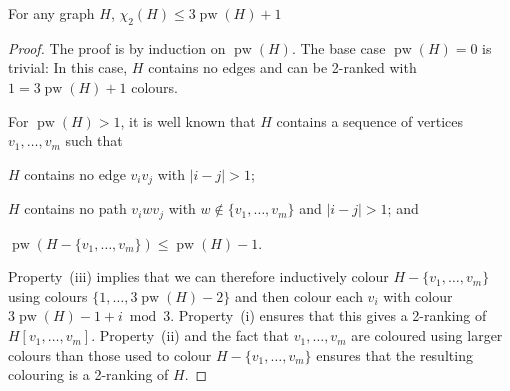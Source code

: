 \documentclass[kpfonts]{patmorin}
\DeclareMathOperator{\pw}{pw}
\newcommand{\trn}{\chi_2}
\newcommand{\htrn}{\hat{\chi}_2}
\theoremstyle{named}
\begin{document}
%
%


\begin{lem}\label{pathwidth}
    For any graph $H$, $\trn(H)\le 3\pw(H) + 1$
\end{lem}

\begin{proof}
    The proof is by induction on $\pw(H)$.  The base case $\pw(H)=0$ is trivial: In this case, $H$ contains no edges and can be 2-ranked with $1 = 3\pw(H)+1$ colours.

    For $\pw(H)>1$, it is well known that $H$ contains a sequence of vertices $v_1,\ldots,v_m$  such that
    \begin{inparaenum}[(i)]
        \item $H$ contains no edge $v_iv_j$ with $|i-j|>1$;
        \item $H$ contains no path $v_iw v_j$ with $w\not\in\{v_1,\ldots,v_m\}$ and $|i-j|>1$; and
        \item $\pw(H-\{v_1,\ldots,v_m\})\le \pw(H)-1$.
    \end{inparaenum}
    Property~(iii) implies that we can therefore inductively colour $H-\{v_1,\ldots,v_m\}$ using colours $\{1,\ldots,3\pw(H)-2\}$ and then colour each $v_i$ with colour $3\pw(H)-1+i\bmod 3$.  Property~(i) ensures that this gives a 2-ranking of $H[v_1,\ldots,v_m]$.  Property~(ii) and the fact that $v_1,\ldots,v_m$ are coloured using larger colours than those used to colour $H-\{v_1,\ldots,v_m\}$ ensures that the resulting colouring is a 2-ranking of $H$.
\end{proof}
\end{document}
